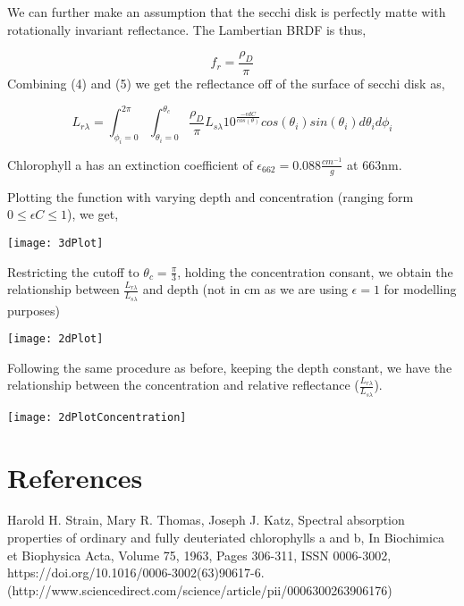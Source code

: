 \documentclass{article}
\begin{document}
We can further make an assumption that the secchi disk is perfectly matte with rotationally
invariant reflectance. The Lambertian BRDF is thus,

\begin{equation}
  f_r = \frac{\rho_D}{\pi}
\end{equation}
Combining (4) and (5) we get the reflectance off of the surface of secchi disk as,

\begin{equation}
  L_{r \lambda} = \int^{2\pi}_{\phi_i = 0}\int^{\theta_c}_{\theta_i = 0}
  \frac{\rho_D}{\pi} L_{s\lambda} 10^\frac{-\epsilon d C}{cos(\theta)}cos(\theta_i)sin(\theta_i)d\theta_i d\phi_i
\end{equation}

Chlorophyll a has an extinction coefficient of $ \epsilon_{662} = 0.088 \frac{cm^{-1}}{g}$ at 663nm.

Plotting the function with varying depth and concentration (ranging form $0 \leq \epsilon C \leq1$), we get,

\begin{center}
    \texttt{[image: 3dPlot]}
\end{center}
Restricting the cutoff to $ \theta_c = \frac{\pi}{3}$, holding the concentration consant,
we obtain the relationship between $ \frac{L_{r\lambda}}{L_{s\lambda}}$ and depth (not in cm as we are using
$ \epsilon =1$ for modelling purposes)
\begin{center}
    \texttt{[image: 2dPlot]}
\end{center}
Following the same procedure as before, keeping the depth constant, we have the relationship between the
concentration and relative reflectance ($ \frac{L_{r\lambda}}{L_{s\lambda}}$).
\begin{center}
  \texttt{[image: 2dPlotConcentration]}
\end{center}

\section{References}

Harold H. Strain, Mary R. Thomas, Joseph J. Katz, Spectral absorption properties of ordinary and fully deuteriated chlorophylls a and b, In Biochimica et Biophysica Acta, Volume 75, 1963, Pages 306-311, ISSN 0006-3002, https://doi.org/10.1016/0006-3002(63)90617-6.
(http://www.sciencedirect.com/science/article/pii/0006300263906176)
\end{document}

